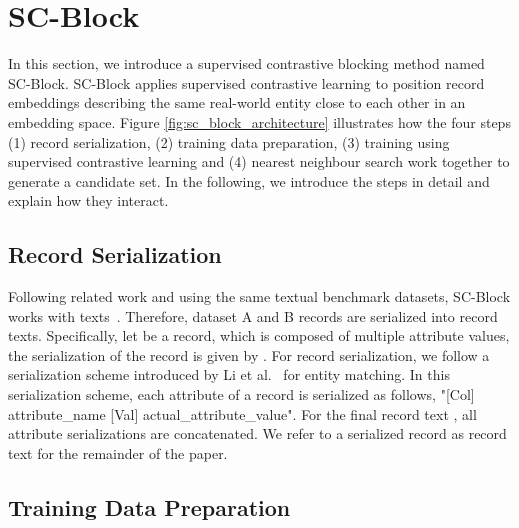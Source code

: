 \documentclass[sigconf,nonacm]{acmart}
\begin{document}
 \section{SC-Block}
\label{sec:sc_block}

In this section, we introduce a supervised contrastive blocking method named SC-Block. SC-Block applies supervised contrastive learning to position record embeddings describing the same real-world entity close to each other in an embedding space.
Figure \ref{fig:sc_block_architecture} illustrates how the four steps (1) record serialization, (2) training data preparation, (3) training using supervised contrastive learning and (4) nearest neighbour search work together to generate a candidate set. In the following, we introduce the steps in detail and explain how they interact.

\subsection{Record Serialization}
\label{sub-sec:serialization}

Following related work and using the same textual benchmark datasets, SC-Block works with texts~\cite{li_deep_2020, wang_sudowoodo_2022, thirumuruganathan_deep_2021}. 
Therefore, dataset A and B records are serialized into record texts. 
Specifically, let  be a record, which is composed of multiple attribute values, the serialization of the record is given by .
For record serialization, we follow a serialization scheme introduced by Li et al.~\cite{li_deep_2020} for entity matching. 
In this serialization scheme, each attribute of a record is serialized as follows, 
"[Col] attribute\_name [Val] actual\_attribute\_value".
For the final record text , all attribute serializations are concatenated.
We refer to a serialized record as record text for the remainder of the paper.

\subsection{Training Data Preparation}
\label{sub-sec:training_data}
\end{document}
